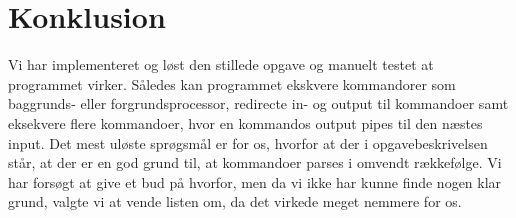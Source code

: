 \section{Konklusion}
Vi har implementeret og løst den stillede opgave og manuelt testet at programmet virker. Således kan programmet ekskvere kommandorer som baggrunds- eller forgrundsprocessor, redirecte in- og output til kommandoer samt eksekvere flere kommandoer, hvor en kommandos output pipes til den næstes input. Det mest uløste sprøgsmål er for os, hvorfor at der i opgavebeskrivelsen står, at der er en god grund til, at kommandoer parses i omvendt rækkefølge. Vi har forsøgt at give et bud på hvorfor, men da vi ikke har kunne finde nogen klar grund, valgte vi at vende listen om, da det virkede meget nemmere for os. 
